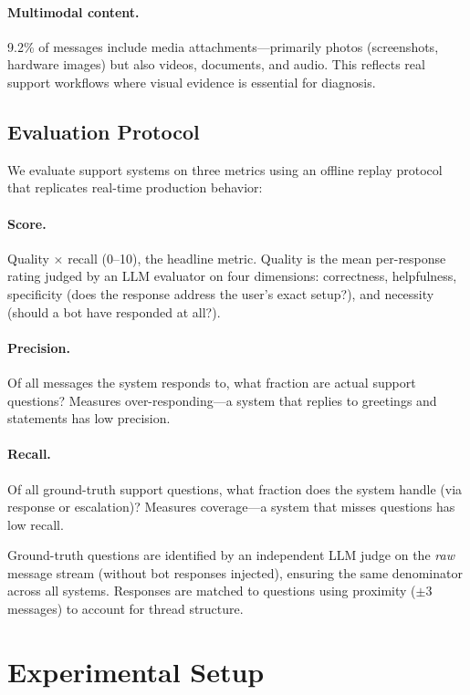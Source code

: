 \documentclass[11pt]{article}
\begin{document}
\paragraph{Multimodal content.} 9.2\% of messages include media attachments---primarily photos (screenshots, hardware images) but also videos, documents, and audio. This reflects real support workflows where visual evidence is essential for diagnosis.

\subsection{Evaluation Protocol}
\label{sec:eval-protocol}

We evaluate support systems on three metrics using an offline replay protocol that replicates real-time production behavior:

\paragraph{Score.} Quality $\times$ recall (0--10), the headline metric. Quality is the mean per-response rating judged by an LLM evaluator \citep{zheng2023judging} on four dimensions: correctness, helpfulness, specificity (does the response address the user's exact setup?), and necessity (should a bot have responded at all?).

\paragraph{Precision.} Of all messages the system responds to, what fraction are actual support questions? Measures over-responding---a system that replies to greetings and statements has low precision.

\paragraph{Recall.} Of all ground-truth support questions, what fraction does the system handle (via response or escalation)? Measures coverage---a system that misses questions has low recall.

Ground-truth questions are identified by an independent LLM judge on the \emph{raw} message stream (without bot responses injected), ensuring the same denominator across all systems. Responses are matched to questions using proximity ($\pm 3$ messages) to account for thread structure.

\section{Experimental Setup}
\end{document}
